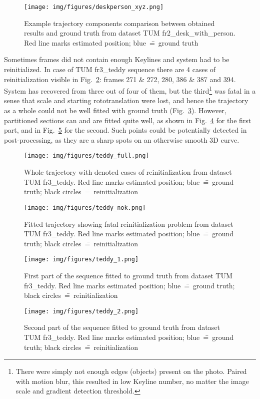 \begin{figure}[ht]
	\centering\texttt{[image: img/figures/deskperson\_xyz.png]}
	\caption{ Example trajectory components comparison between obtained results and ground truth from dataset TUM fr2\_desk\_with\_person. Red line marks estimated position; blue~\==~ground truth }
	\label{fig:trajectxyz}
\end{figure}

Sometimes frames did not contain enough Keylines and system had to be reinitialized. In case of TUM fr3\_teddy sequence there are 4 cases of reinitialization visible in Fig.~\ref{fig:teddyfull}: frames 271 \& 272, 280, 386 \& 387 and 394. System has recovered from three out of four of them, but the third\footnote{There were simply not enough edges (objects) present on the photo. Paired with motion blur, this resulted in low Keyline number, no matter the image scale and gradient detection threshold.} was fatal in a sense that scale and starting rototranslation were lost, and hence the trajectory as a whole could not be well fitted with ground truth (Fig.~\ref{fig:teddynok}). However, partitioned sections can and are fitted quite well, as shown in Fig.~\ref{fig:teddy1} for the first part, and in Fig.~\ref{fig:teddy2} for the second. Such points could be potentially detected in post-processing, as they are a sharp spots on an otherwise smooth 3D curve.

\begin{figure}[ht]
	\centering\texttt{[image: img/figures/teddy\_full.png]}
	\caption{ Whole trajectory with denoted cases of reinitialization from dataset TUM fr3\_teddy. Red line marks estimated position; blue~\==~ground truth; black circles~\==~reinitialization }
	\label{fig:teddyfull}
\end{figure}
\begin{figure}[ht]
	\centering\texttt{[image: img/figures/teddy\_nok.png]}
	\caption{ Fitted trajectory showing fatal reinitialization problem from dataset TUM fr3\_teddy. Red line marks estimated position; blue~\==~ground truth; black circles~\==~reinitialization }
	\label{fig:teddynok}
\end{figure}
\begin{figure}[ht]
	\centering\texttt{[image: img/figures/teddy\_1.png]}
	\caption{ First part of the sequence fitted to ground truth from dataset TUM fr3\_teddy. Red line marks estimated position; blue~\==~ground truth; black circles~\==~reinitialization }
	\label{fig:teddy1}
\end{figure}
\begin{figure}[ht]
	\centering\texttt{[image: img/figures/teddy\_2.png]}
	\caption{ Second part of the sequence fitted to ground truth from dataset TUM fr3\_teddy. Red line marks estimated position; blue~\==~ground truth; black circles~\==~reinitialization }
	\label{fig:teddy2}
\end{figure}


